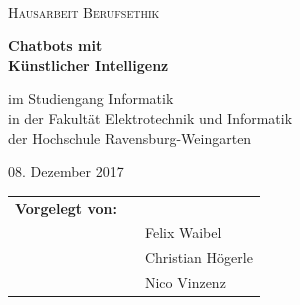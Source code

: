 \begin{figure}[ht]
	\hfill
	\\[1.5cm]
\end{figure}

\begin{center}
	\textsc{\Large{Hausarbeit Berufsethik\\[1.5cm]}}
\end{center}

\begin{center}
	\LARGE{\textbf{
			Chatbots mit \\
			Künstlicher Intelligenz \\[2.0cm]
			
	}}
\end{center}

\begin{center}
	\small{im Studiengang Informatik}\\
	\small{in der Fakultät Elektrotechnik und Informatik}\\
	\small{der Hochschule Ravensburg-Weingarten}\\[2.0cm]
\end{center}

\begin{center}
	\large{08. Dezember 2017\\[2.0cm]}
\end{center}

\begin{center}
	\begin{tabular}{lll}
		\textbf{Vorgelegt von:}\\
		 & & Felix Waibel\\
		&& Christian Högerle\\
		&& Nico Vinzenz
	\end{tabular}
\end{center}